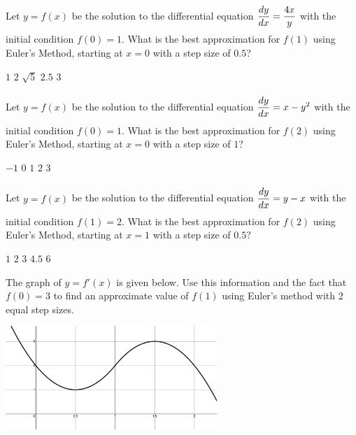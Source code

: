 \begin{questions}
    \question Let $y = f(x)$ be the solution to the differential equation $\dfrac{dy}{dx} = \dfrac{4x}{y} \forcespace$ with the initial condition $f(0) = 1$. What is the best approximation for $f(1)$ using Euler's Method, starting at $x = 0$ with a step size of $0.5$? \\

    \begin{oneparchoices}
        \choice $1$
        \choice $2$
        \choice $\sqrt{5}$
        \choice $2.5$
        \choice $3$
    \end{oneparchoices} \par \horizontalline

    \question Let $y = f(x)$ be the solution to the differential equation $\dfrac{dy}{dx} = x - y^2 \forcespace$ with the initial condition $f(0) = 1$. What is the best approximation for $f(2)$ using Euler's Method, starting at $x = 0$ with a step size of $1$? \\

    \begin{oneparchoices}
        \choice $-1$
        \choice $0$
        \choice $1$
        \choice $2$
        \choice $3$
    \end{oneparchoices} \par \horizontalline

    \question Let $y = f(x)$ be the solution to the differential equation $\dfrac{dy}{dx} = y - x \forcespace$ with the initial condition $f(1) = 2$. What is the best approximation for $f(2)$ using Euler's Method, starting at $x = 1$ with a step size of $0.5$? \\

    \begin{oneparchoices}
        \choice $1$
        \choice $2$
        \choice $3$
        \choice $4.5$
        \choice $6$
    \end{oneparchoices} \par \horizontalline

    \question The graph of $y = f'(x)$ is given below. Use this information and the fact that $f(0) = 3$ to find an approximate value of $f(1)$ using Euler's method with 2 equal step sizes. \\

    \begin{center}
        \includegraphics[width = 0.6\textwidth]{Support/Chapter 1 Graphics/1.6-Graphic4.png}
    \end{center} 


\end{questions}
